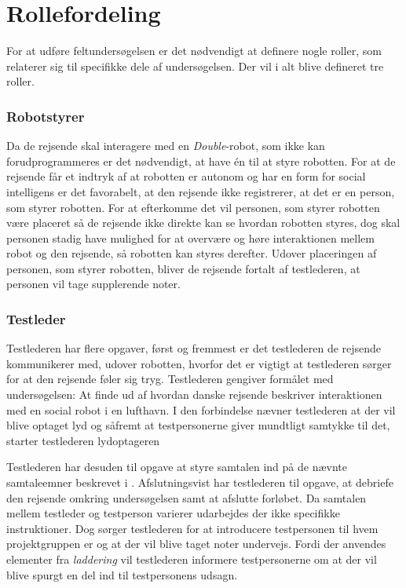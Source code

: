 \section{Rollefordeling}
\label{ParametreRollefordeling}
%
For at udføre feltundersøgelsen er det nødvendigt at definere nogle roller, som relaterer sig til specifikke dele af undersøgelsen. Der vil i alt blive defineret tre roller.
%
\subsubsection*{Robotstyrer}
Da de rejsende skal interagere med en \textit{Double}-robot, som ikke kan forudprogrammeres er det nødvendigt, at have én til at styre robotten. For at de rejsende får et indtryk af at robotten er autonom og har en form for social intelligens er det favorabelt, at den rejsende ikke registrerer, at det er en person, som styrer robotten. For at efterkomme det vil personen, som styrer robotten være placeret så de rejsende ikke direkte kan se hvordan robotten styres, dog skal personen stadig have mulighed for at overvære og høre interaktionen mellem robot og den rejsende, så robotten kan styres derefter. Udover placeringen af personen, som styrer robotten, bliver de rejsende fortalt af testlederen, at personen vil tage supplerende noter. 

\subsubsection*{Testleder}
Testlederen har flere opgaver, først og fremmest er det testlederen de rejsende kommunikerer med, udover robotten, hvorfor det er vigtigt at testlederen sørger for at den rejsende føler sig tryg. Testlederen gengiver formålet med undersøgelsen: At finde ud af hvordan danske rejsende beskriver interaktionen med en social robot i en lufthavn. I den forbindelse nævner testlederen at der vil blive optaget lyd og såfremt at testpersonerne giver mundtligt samtykke til det, starter testlederen lydoptageren

Testlederen har desuden til opgave at styre samtalen ind på de nævnte samtaleemner beskrevet i . Afslutningsvist har testlederen til opgave, at debriefe den rejsende omkring undersøgelsen samt at afslutte forløbet. Da samtalen mellem testleder og testperson varierer udarbejdes der ikke specifikke instruktioner. Dog sørger testlederen for at introducere testpersonen til hvem projektgruppen er og at der vil blive taget noter undervejs. Fordi der anvendes elementer fra \textit{laddering} vil testlederen informere testpersonerne om at der vil blive spurgt en del ind til testpersonens udsagn.

